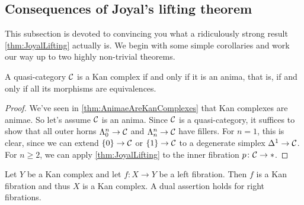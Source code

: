 \subsection{Consequences of Joyal's lifting theorem}
This subsection is devoted to convincing you what a ridiculously strong result \cref{thm:JoyalLifting} actually is. We begin with some simple corollaries and work our way up to two highly non-trivial theorems.
\begin{cor}\label{cor:AnimaKanComplexes}
	A quasi-category $\mathcal{C}$ is a Kan complex if and only if it is an anima, that is, if and only if all its morphisms are equivalences.
\end{cor}
\begin{proof}
	We've seen in \cref{thm:AnimaeAreKanComplexes} that Kan complexes are animae. So let's assume $\mathcal{C}$ is an anima. Since $\mathcal{C}$ is a quasi-category, it suffices to show that all outer horns $\Lambda_0^n\rightarrow \mathcal{C}$ and $\Lambda_n^n\rightarrow \mathcal{C}$ have fillers. For $n=1$, this is clear, since we can extend $\{0\}\rightarrow \mathcal{C}$ or $\{1\}\rightarrow\mathcal{C}$ to a degenerate simplex $\Delta^1\rightarrow\mathcal{C}$. For $n\geqslant 2$, we can apply \cref{thm:JoyalLifting} to the inner fibration $p\colon \mathcal{C}\rightarrow *$.
\end{proof}
\begin{cor}\label{cor:LeftFibrationsOverAnima}
	Let $Y$ be a Kan complex and let $f\colon X\rightarrow Y$ be a left fibration. Then $f$ is a Kan fibration and thus $X$ is a Kan complex. A dual assertion holds for right fibrations.
\end{cor}
